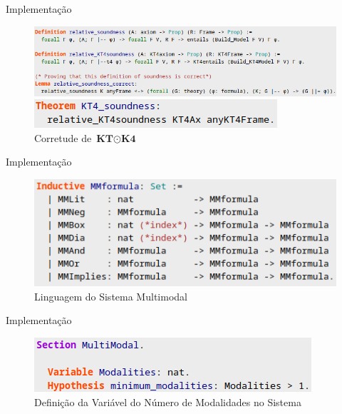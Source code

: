 \documentclass[xcolor=table]{beamer}
\newcommand{\SisT}{\(\textbf{KT} \mathbin{\odot} \textbf{K4}\)\xspace}
\begin{document}
    \begin{frame}{Implementação}
        \begin{figure}[htbp]
            \centering
            \includegraphics[width=\linewidth+.7cm,keepaspectratio]{KT4RelativeSoundness.png}
            \begin{flushleft}
                \includegraphics[scale=.6]{KT4Soundness.png}
            \end{flushleft}
            \caption{Corretude de \SisT}
        \end{figure}
    \end{frame}

    \begin{frame}{Implementação}
        \begin{figure}[htbp]
            \centering
            \includegraphics[scale=.6]{LinguagemMM.png}
            \caption{Linguagem do Sistema Multimodal}
        \end{figure}
    \end{frame}

    \begin{frame}{Implementação}
        \begin{figure}[htbp]
            \centering
            \includegraphics[scale=.6]{VariavelModalidades.png}
            \caption{Definição da Variável do Número de Modalidades no Sistema}
        \end{figure}
    \end{frame}
\end{document}
